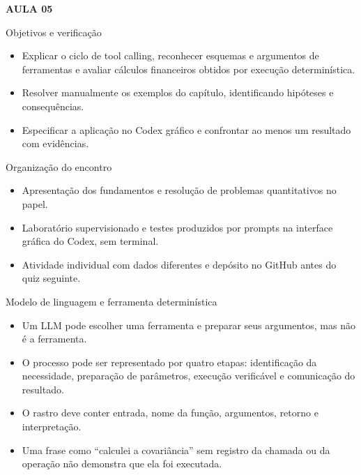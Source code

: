 \documentclass[10pt,aspectratio=169]{beamer}
\begin{document}
\begin{frame}[t]{}
\vspace{14mm}\textcolor{InsperRed}{\bfseries AULA 05}\par\vspace{4mm}{\LARGE\bfseries Integração de ferramentas computacionais}\par\vspace{6mm}{\large Finanças}\par{}
\end{frame}

\begin{frame}[t]{Objetivos e verificação}
\small
\begin{itemize}
\item Explicar o ciclo de tool calling, reconhecer esquemas e argumentos de ferramentas e avaliar cálculos financeiros obtidos por execução determinística.
\item Resolver manualmente os exemplos do capítulo, identificando hipóteses e consequências.
\item Especificar a aplicação no Codex gráfico e confrontar ao menos um resultado com evidências.
\end{itemize}
\end{frame}

\begin{frame}[t]{Organização do encontro}
\small
\begin{itemize}
\item Apresentação dos fundamentos e resolução de problemas quantitativos no papel.
\item Laboratório supervisionado e testes produzidos por prompts na interface gráfica do Codex, sem terminal.
\item Atividade individual com dados diferentes e depósito no GitHub antes do quiz seguinte.
\end{itemize}
\end{frame}

\begin{frame}[t]{Modelo de linguagem e ferramenta determinística}
\small
\begin{itemize}
\item Um LLM pode escolher uma ferramenta e preparar seus argumentos, mas não é a ferramenta.
\item O processo pode ser representado por quatro etapas: identificação da necessidade, preparação de parâmetros, execução verificável e comunicação do resultado.
\item O rastro deve conter entrada, nome da função, argumentos, retorno e interpretação.
\item Uma frase como ``calculei a covariância'' sem registro da chamada ou da operação não demonstra que ela foi executada.
\end{itemize}
\end{frame}
\end{document}
